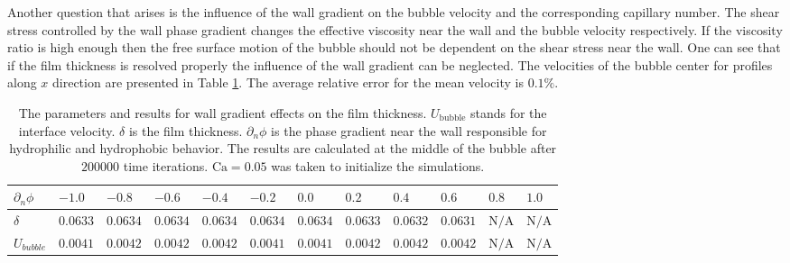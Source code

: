 \documentclass[preprint,12pt]{elsarticle}
\newcommand{\Ca}{\mathrm{Ca}}
\begin{document}
Another question that arises is the influence of the wall gradient on the bubble velocity and the
corresponding capillary number. The shear stress controlled by the wall phase gradient changes the
effective viscosity near the wall and the bubble velocity respectively. If the viscosity ratio is
high enough then the free surface motion of the bubble should not be dependent on the shear stress
near the wall.
One can see that if the film thickness is resolved properly the influence of the wall gradient can
be neglected. The velocities of the bubble center for profiles along $x$ direction are
presented in Table
\ref{table:parameters:wall:gradient}. 
The average relative error for the mean velocity is $0.1\%$.
\begin{table}
\begin{tabularx}{\textwidth}{|X|X X X X X X X X X X X|}
\hline
$\scriptstyle \partial_n \phi$& $\scriptstyle -1.0$& $\scriptstyle -0.8$&
$\scriptstyle -0.6$&$\scriptstyle -0.4$&$\scriptstyle -0.2$&$\scriptstyle
0.0$&$\scriptstyle 0.2$&$\scriptstyle 0.4$&$\scriptstyle 0.6$&$\scriptstyle 0.8$&$\scriptstyle
1.0$\\
\hline
$\scriptstyle \delta$& $\scriptstyle 0.0633$& $\scriptstyle 0.0634$& $\scriptstyle 0.0634$&
$\scriptstyle 0.0634$& $\scriptstyle 0.0634$& $\scriptstyle 0.0634$& $\scriptstyle 0.0633$&
$\scriptstyle 0.0632$& $\scriptstyle 0.0631$ &$\scriptstyle \mathrm{N/A}$&$\scriptstyle
\mathrm{N/A}$\\
\hline
$\scriptstyle U_{bubble}$ &$\scriptstyle 0.0041$& $\scriptstyle 0.0042$& $\scriptstyle 0.0042$
&$\scriptstyle 0.0042$ & $\scriptstyle 0.0041$& $\scriptstyle 0.0041$ & $\scriptstyle 0.0042$ &
$\scriptstyle 0.0042$ & $\scriptstyle 0.0042$ & $\scriptstyle \mathrm{N/A}$ &$\scriptstyle
\mathrm{N/A}$\\
\hline
\end{tabularx}
\caption{The parameters and results for wall gradient effects on the film thickness.
$U_{\mathrm{bubble}}$
stands for the interface velocity. $\delta$ is the film thickness. $\partial_n \phi$ is the phase
gradient near the wall responsible for hydrophilic and hydrophobic behavior. The results are
calculated at the middle of the bubble after $200 000$ time iterations. $\Ca=0.05$ was taken to
initialize the simulations.
\label{table:parameters:wall:gradient}}
\end{table}
\end{document}
